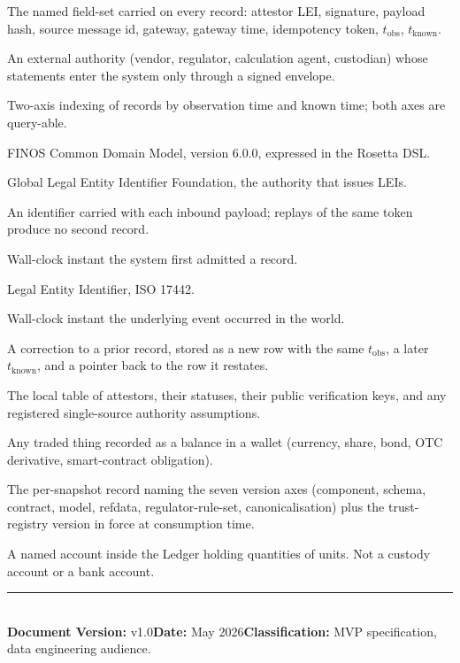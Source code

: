 \documentclass[11pt,a4paper]{article}
\newcounter{rul}
\begin{document}
\begin{description}[style=nextline]
\item[Attestation envelope] The named field-set carried on every record: attestor LEI, signature, payload hash, source message id, gateway, gateway time, idempotency token, $t_{\text{obs}}$, $t_{\text{known}}$.
\item[Attestor] An external authority (vendor, regulator, calculation agent, custodian) whose statements enter the system only through a signed envelope.
\item[Bitemporal] Two-axis indexing of records by observation time and known time; both axes are query-able.
\item[CDM] FINOS Common Domain Model, version 6.0.0, expressed in the Rosetta DSL.
\item[GLEIF] Global Legal Entity Identifier Foundation, the authority that issues LEIs.
\item[Idempotency token] An identifier carried with each inbound payload; replays of the same token produce no second record.
\item[Known time ($t_{\text{known}}$)] Wall-clock instant the system first admitted a record.
\item[LEI] Legal Entity Identifier, ISO 17442.
\item[Observation time ($t_{\text{obs}}$)] Wall-clock instant the underlying event occurred in the world.
\item[Restatement] A correction to a prior record, stored as a new row with the same $t_{\text{obs}}$, a later $t_{\text{known}}$, and a pointer back to the row it restates.
\item[Trust registry] The local table of attestors, their statuses, their public verification keys, and any registered single-source authority assumptions.
\item[Unit] Any traded thing recorded as a balance in a wallet (currency, share, bond, OTC derivative, smart-contract obligation).
\item[VersionPin] The per-snapshot record naming the seven version axes (component, schema, contract, model, refdata, regulator-rule-set, canonicalisation) plus the trust-registry version in force at consumption time.
\item[Wallet] A named account inside the Ledger holding quantities of units. Not a custody account or a bank account.
\end{description}

\vspace{1em}
\noindent\rule{\textwidth}{0.4pt}\\
\noindent\textbf{Document Version:} v1.0\quad\textbf{Date:} May 2026\quad\textbf{Classification:} MVP specification, data engineering audience.
\end{document}
